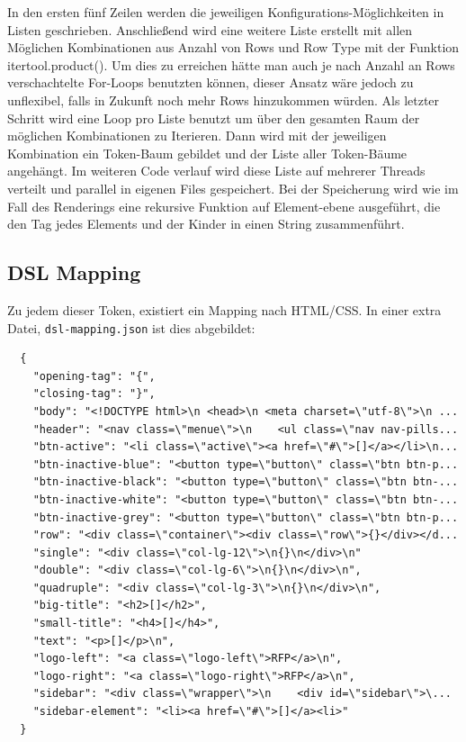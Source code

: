 \documentclass[pdftex,a4paper,halfparskip, article]{scrartcl}
\begin{document}
In den ersten fünf Zeilen werden die jeweiligen Konfigurations-Möglichkeiten in Listen geschrieben. Anschließend wird eine weitere Liste erstellt mit allen Möglichen Kombinationen aus Anzahl von Rows und Row Type mit der Funktion itertool.product(). Um dies zu erreichen hätte man auch je nach Anzahl an Rows verschachtelte For-Loops benutzten können, dieser Ansatz wäre jedoch zu unflexibel, falls in Zukunft noch mehr Rows hinzukommen würden.
Als letzter Schritt wird eine Loop pro Liste benutzt um über den gesamten Raum der möglichen Kombinationen zu Iterieren. Dann wird mit der jeweiligen Kombination ein Token-Baum gebildet und der Liste aller Token-Bäume angehängt. Im weiteren Code verlauf wird diese Liste auf mehrerer Threads verteilt und parallel in eigenen Files gespeichert.
Bei der Speicherung wird wie im Fall des Renderings eine rekursive Funktion auf Element-ebene ausgeführt, die den Tag jedes Elements und der Kinder in einen String zusammenführt.

\subsection{DSL Mapping}

Zu jedem dieser Token, existiert ein Mapping nach HTML/CSS. In einer extra Datei, \texttt{dsl-mapping.json} ist dies abgebildet:

\begin{verbatim}
  {
    "opening-tag": "{",
    "closing-tag": "}",
    "body": "<!DOCTYPE html>\n <head>\n <meta charset=\"utf-8\">\n ...
    "header": "<nav class=\"menue\">\n    <ul class=\"nav nav-pills...
    "btn-active": "<li class=\"active\"><a href=\"#\">[]</a></li>\n...
    "btn-inactive-blue": "<button type=\"button\" class=\"btn btn-p...
    "btn-inactive-black": "<button type=\"button\" class=\"btn btn-...
    "btn-inactive-white": "<button type=\"button\" class=\"btn btn-...
    "btn-inactive-grey": "<button type=\"button\" class=\"btn btn-p...
    "row": "<div class=\"container\"><div class=\"row\">{}</div></d...
    "single": "<div class=\"col-lg-12\">\n{}\n</div>\n"
    "double": "<div class=\"col-lg-6\">\n{}\n</div>\n",
    "quadruple": "<div class=\"col-lg-3\">\n{}\n</div>\n",
    "big-title": "<h2>[]</h2>",
    "small-title": "<h4>[]</h4>",
    "text": "<p>[]</p>\n",
    "logo-left": "<a class=\"logo-left\">RFP</a>\n",
    "logo-right": "<a class=\"logo-right\">RFP</a>\n",
    "sidebar": "<div class=\"wrapper\">\n    <div id=\"sidebar\">\...
    "sidebar-element": "<li><a href=\"#\">[]</a><li>"  
  }
  
\end{verbatim}
\end{document}
